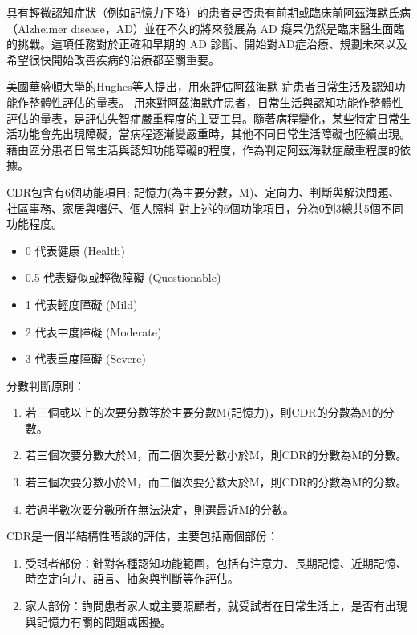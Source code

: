 具有輕微認知症狀（例如記憶力下降）的患者是否患有前期或臨床前阿茲海默氏病（Alzheimer disease，AD）並在不久的將來發展為 AD 癡呆仍然是臨床醫生面臨的挑戰。這項任務對於正確和早期的 AD 診斷、開始對AD症治療、規劃未來以及希望很快開始改善疾病的治療都至關重要。

美國華盛頓大學的Hughes等人提出，用來評估阿茲海默 症患者日常生活及認知功能作整體性評估的量表。
用來對阿茲海默症患者，日常生活與認知功能作整體性評估的量表，是評估失智症嚴重程度的主要工具。隨著病程變化，某些特定日常生活功能會先出現障礙，當病程逐漸變嚴重時，其他不同日常生活障礙也陸續出現。藉由區分患者日常生活與認知功能障礙的程度，作為判定阿茲海默症嚴重程度的依據。


CDR包含有6個功能項目:
記憶力(為主要分數，M)、定向力、判斷與解決問題、社區事務、家居與嗜好、個人照料
對上述的6個功能項目，分為0到3總共5個不同功能程度。

\begin{itemize}
    \item
    0 代表健康 (Health)
    \item
    0.5 代表疑似或輕微障礙 (Questionable)
    \item
    1 代表輕度障礙 (Mild)
    \item
    2 代表中度障礙 (Moderate)
    \item
    3 代表重度障礙 (Severe)
\end{itemize}

分數判斷原則：
\begin{enumerate}
\item
若三個或以上的次要分數等於主要分數M(記憶力)，則CDR的分數為M的分數。
\item
若三個次要分數大於M，而二個次要分數小於M，則CDR的分數為M的分數。
\item
若三個次要分數小於M，而二個次要分數大於M，則CDR的分數為M的分數。
\item
若過半數次要分數所在無法決定，則選最近M的分數。
\end{enumerate}

CDR是一個半結構性晤談的評估，主要包括兩個部份：
\begin{enumerate}
	\item
受試者部份：針對各種認知功能範圍，包括有注意力、長期記憶、近期記憶、時空定向力、語言、抽象與判斷等作評估。
\item
家人部份：詢問患者家人或主要照顧者，就受試者在日常生活上，是否有出現與記憶力有關的問題或困擾。
\end{enumerate}

